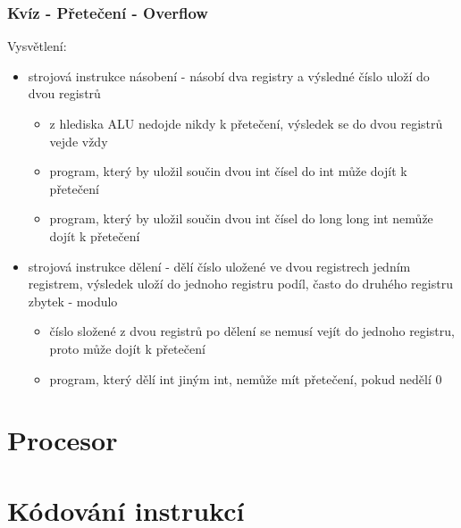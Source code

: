 \documentclass{beamer}
\begin{document}
\begin{frame}
\frametitle{Kvíz - Přetečení - Overflow}

Vysvětlení:
\begin{itemize}
\item strojová instrukce násobení - násobí dva registry a výsledné číslo uloží do dvou registrů
\begin{itemize}
\item z hlediska ALU nedojde nikdy k přetečení, výsledek se do dvou registrů vejde vždy
\item program, který by uložil součin dvou int čísel do int může dojít k přetečení
\item program, který by uložil součin dvou int čísel do long long int nemůže dojít k přetečení
\end{itemize}
\item strojová instrukce dělení - dělí číslo uložené ve dvou registrech jedním registrem, výsledek uloží do jednoho registru podíl, často do druhého registru zbytek - modulo
\begin{itemize}
\item číslo složené z dvou registrů po dělení se nemusí vejít do jednoho registru, proto může dojít k přetečení
\item program, který dělí int jiným int, nemůže mít přetečení, pokud nedělí 0
\end{itemize}
\end{itemize}

\end{frame}

\section{Procesor}



\section{Kódování instrukcí}










\end{document}
